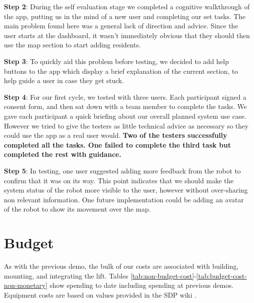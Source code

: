 \documentclass{article}
\begin{document}
{\bf Step 2}: During the self evaluation stage we completed a cognitive walkthrough of the app, putting us in the mind of a new user and completing our set tasks. The main problem found here was a general lack of direction and advice. Since the user starts at the dashboard, it wasn't immediately obvious that they should then use the map section to start adding residents.

{\bf Step 3}: To quickly aid this problem before testing, we decided to add help buttons to the app which display a brief explanation of the current section, to help guide a user in case they get stuck.

{\bf Step 4}: For our first cycle, we tested with three users. Each participant signed a consent form, and then sat down with a team member to complete the tasks. We gave each participant a quick briefing about our overall planned system use case. However we tried to give the testers as little technical advice as necessary so they could use the app as a real user would. {\bf Two of the testers successfully completed all the tasks. One failed to complete the third task but completed the rest with guidance.}

{\bf Step 5}: In testing, one user suggested adding more feedback from the robot to confirm that it was on its way. This point indicates that we should make the system status of the robot more visible to the user, however without over-sharing non relevant information. One future implementation could be adding an avatar of the robot to show its movement over the map.

\section{Budget}
As with the previous demo, the bulk of our costs are associated with building, mounting, and integrating the lift. Tables \ref{tab:non-budget-cost}-\ref{tab:budget-cost-non-monetary} show spending to date including spending at previous demos. Equipment costs are based on values provided in the SDP wiki \cite{sdpcosts}.

\begin{table}[h]
\begin{center}
\caption{Non-budgeted monetary costs at demo \demoNumber. Note that we have chosen to stop using the EV3 and instead use the Arduino kit.}
\label{tab:non-budget-cost}
\end{center}
\end{table}
\end{document}
